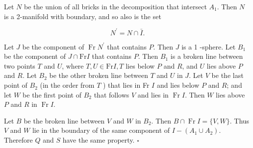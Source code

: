 Let $N$ be the union of all bricks in the decomposition that intersect $A_{1}$. Then $N$ is a 2-manifold with boundary, and so also is the set

$$
N^{\prime}=N \cap \bar{I} .
$$

Let $J$ be the component of $\operatorname{Fr} N^{\prime}$ that contains $P$. Then $J$ is a 1 -sphere. Let $B_{1}$ be the component of $J \cap \mathrm{Fr} I$ that contains $P$. Then $B_{1}$ is a broken line between two points $T$ and $U$, where $T, U \in \mathrm{Fr} I, T$ lies below $P$ and $R$, and $U$ lies above $P$ and $R$. Let $B_{2}$ be the other broken line between $T$ and $U$ in $J$. Let $V$ be the last point of $B_{2}$ (in the order from $T$ ) that lies in Fr $I$ and lies below $P$ and $R$; and let $W$ be the first point of $B_{2}$ that follows $V$ and lies in $\operatorname{Fr} I$. Then $W$ lies above $P$ and $R$ in $\operatorname{Fr} I$.

\begin{center}
\end{center}


Let $B$ be the broken line between $V$ and $W$ in $B_{2}$. Then $B \cap \operatorname{Fr} I= \{V, W\}$. Thus $V$ and $W$ lie in the boundary of the same component of $I-\left(A_{1} \cup A_{2}\right)$. Therefore $Q$ and $S$ have the same property. \(\square\)
